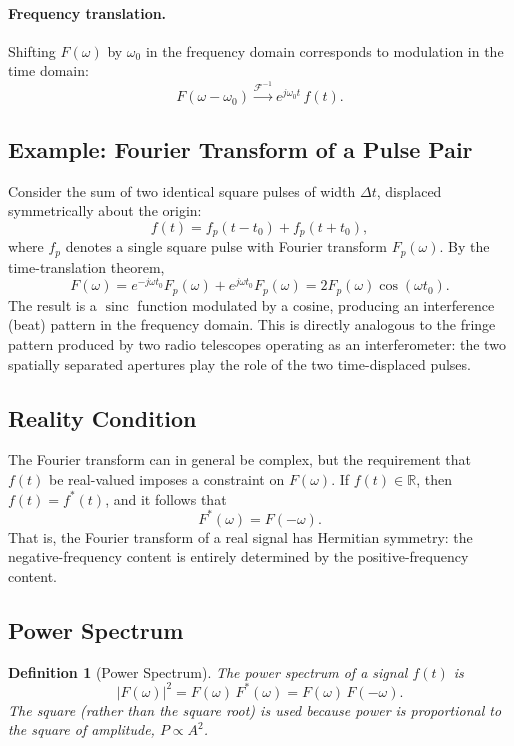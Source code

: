 \documentclass{article}
\newtheorem{definition}{Definition}
\begin{document}
\paragraph{Frequency translation.}
Shifting $F(\omega)$ by $\omega_0$ in the frequency domain corresponds to modulation in the time domain:
\[F(\omega - \omega_0) \xrightarrow{\mathcal{F}^{-1}} e^{j\omega_0 t}\,f(t).\]

\subsection{Example: Fourier Transform of a Pulse Pair}

Consider the sum of two identical square pulses of width $\Delta t$, displaced symmetrically about the origin:
\[f(t) = f_p(t - t_0) + f_p(t + t_0),\]
where $f_p$ denotes a single square pulse with Fourier transform $F_p(\omega)$. By the time-translation theorem,
\[F(\omega) = e^{-j\omega t_0}F_p(\omega) + e^{j\omega t_0}F_p(\omega) = 2F_p(\omega)\cos(\omega t_0).\]
The result is a $\operatorname{sinc}$ function modulated by a cosine, producing an interference (beat) pattern in the frequency domain. This is directly analogous to the fringe pattern produced by two radio telescopes operating as an interferometer: the two spatially separated apertures play the role of the two time-displaced pulses.

\subsection{Reality Condition}

The Fourier transform can in general be complex, but the requirement that $f(t)$ be real-valued imposes a constraint on $F(\omega)$. If $f(t) \in \mathbb{R}$, then $f(t) = f^*(t)$, and it follows that
\[F^*(\omega) = F(-\omega).\]
That is, the Fourier transform of a real signal has Hermitian symmetry: the negative-frequency content is entirely determined by the positive-frequency content.

\subsection{Power Spectrum}

\begin{definition}[Power Spectrum]
    The power spectrum of a signal $f(t)$ is
    \[|F(\omega)|^2 = F(\omega)\,F^*(\omega) = F(\omega)\,F(-\omega).\]
    The square (rather than the square root) is used because power is proportional to the square of amplitude, $P \propto A^2$.
\end{definition}
\end{document}
